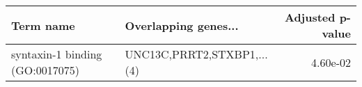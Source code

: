 \begin{tabular}{llr}
\toprule
                      Term name &       Overlapping genes... &  Adjusted p-value \\
\midrule
syntaxin-1 binding (GO:0017075) & UNC13C,PRRT2,STXBP1,...(4) &          4.60e-02 \\
\bottomrule
\end{tabular}
